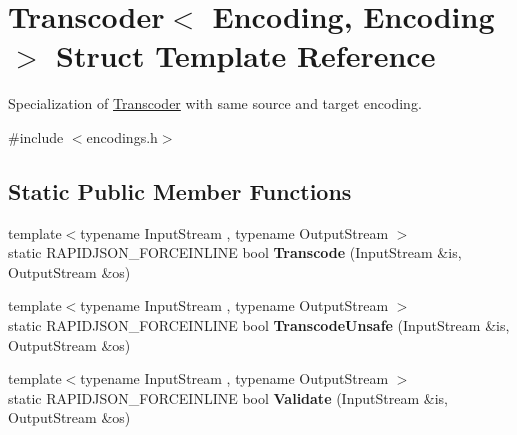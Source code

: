 \hypertarget{structTranscoder_3_01Encoding_00_01Encoding_01_4}{}\section{Transcoder$<$ Encoding, Encoding $>$ Struct Template Reference}
\label{structTranscoder_3_01Encoding_00_01Encoding_01_4}


Specialization of \hyperlink{structTranscoder}{Transcoder} with same source and target encoding.  




{\ttfamily \#include $<$encodings.\+h$>$}

\subsection*{Static Public Member Functions}
\begin{DoxyCompactItemize}
\item 
{\footnotesize template$<$typename Input\+Stream , typename Output\+Stream $>$ }\\static R\+A\+P\+I\+D\+J\+S\+O\+N\+\_\+\+F\+O\+R\+C\+E\+I\+N\+L\+I\+NE bool {\bfseries Transcode} (Input\+Stream \&is, Output\+Stream \&os)\hypertarget{structTranscoder_3_01Encoding_00_01Encoding_01_4_aad11cdc2b829123a7b9969e34d456813}{}\label{structTranscoder_3_01Encoding_00_01Encoding_01_4_aad11cdc2b829123a7b9969e34d456813}

\item 
{\footnotesize template$<$typename Input\+Stream , typename Output\+Stream $>$ }\\static R\+A\+P\+I\+D\+J\+S\+O\+N\+\_\+\+F\+O\+R\+C\+E\+I\+N\+L\+I\+NE bool {\bfseries Transcode\+Unsafe} (Input\+Stream \&is, Output\+Stream \&os)\hypertarget{structTranscoder_3_01Encoding_00_01Encoding_01_4_addf67decfff7d0de510c47842eb53cef}{}\label{structTranscoder_3_01Encoding_00_01Encoding_01_4_addf67decfff7d0de510c47842eb53cef}

\item 
{\footnotesize template$<$typename Input\+Stream , typename Output\+Stream $>$ }\\static R\+A\+P\+I\+D\+J\+S\+O\+N\+\_\+\+F\+O\+R\+C\+E\+I\+N\+L\+I\+NE bool {\bfseries Validate} (Input\+Stream \&is, Output\+Stream \&os)\hypertarget{structTranscoder_3_01Encoding_00_01Encoding_01_4_a536aa3930251161d05e112947ec2f9c8}{}\label{structTranscoder_3_01Encoding_00_01Encoding_01_4_a536aa3930251161d05e112947ec2f9c8}

\end{DoxyCompactItemize}


